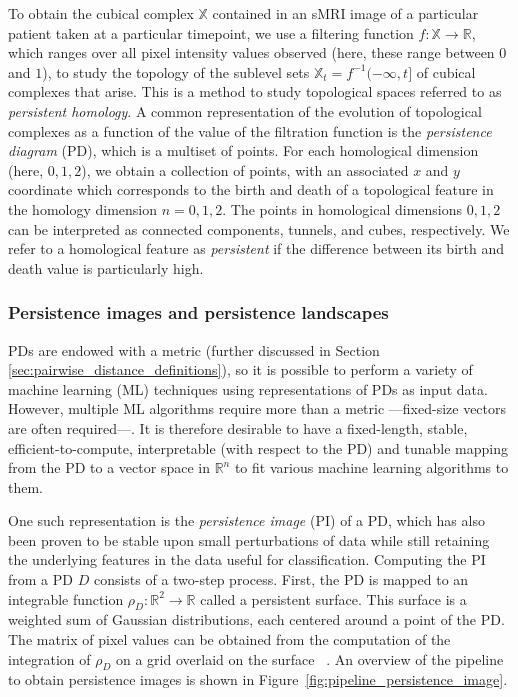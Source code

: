\documentclass{article}
\begin{document}
To obtain the cubical complex $\mathbb{X}$ contained in an sMRI image of a particular patient
taken at a particular timepoint, we use a filtering function $f:\mathbb{X}\to\mathbb{R}$, which
ranges over all pixel intensity values observed (here, these range between $0$ and $1$), to study
the topology of the sublevel sets $\mathbb{X}_t=f^{-1}(-\infty, t]$ of cubical complexes that
arise. This is a method to study topological spaces referred to as \emph{persistent homology}. A
common representation of the evolution of topological complexes as a function of the value of the
filtration function is the \emph{persistence diagram} (PD), which is a multiset of points. For each
homological dimension (here, $0,1,2$), we obtain a collection of points, with an associated $x$ and
$y$ coordinate which corresponds to the birth and death of a topological feature in the homology
dimension $n=0,1,2$. The points in homological dimensions $0,1,2$ can be interpreted as
connected components, tunnels, and cubes, respectively. We refer to a homological feature as
\emph{persistent} if the difference between its birth and death value is particularly high.


\subsubsection{Persistence images and persistence
  landscapes}\label{sec:theory_persistence_landscape_persistence_image}

PDs are endowed with a metric (further discussed in Section
\ref{sec:pairwise_distance_definitions}), so it is possible to perform a variety of machine learning
(ML) techniques using representations of PDs as input data. However, multiple ML algorithms
require more than a metric ---fixed-size vectors are often required---. It is therefore
desirable to have a fixed-length, stable, efficient-to-compute, interpretable (with respect to the
PD) and tunable mapping from the PD to a vector space in $\mathbb{R}^n$ to fit various machine
learning algorithms to them.

One such representation is the \emph{persistence image} (PI) of a PD, which has also been proven to
be stable upon small perturbations of data while still retaining the underlying features in the data
useful for classification. Computing the PI from a PD $D$ consists of a two-step process. First, the
PD is mapped to an integrable function $\rho_D : \mathbb{R}^2\to \mathbb{R}$ called a persistent
surface. This surface is a weighted sum of Gaussian distributions, each centered around a point of
the PD. The matrix of pixel values can be obtained from the computation of the integration of
$\rho_D$ on a grid overlaid on the surface ~\citep{adams2017persistence}. An overview of the
pipeline to obtain persistence images is shown in Figure~\ref{fig:pipeline_persistence_image}.
\end{document}
